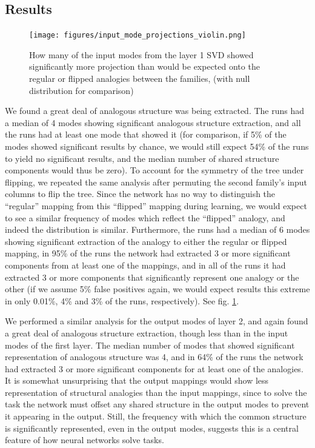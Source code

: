 \documentclass[10pt,letterpaper]{article}
\begin{document}
\subsection{Results}
\begin{figure}
\centering
\texttt{[image: figures/input\_mode\_projections\_violin.png]}
\caption{How many of the input modes from the layer 1 SVD showed significantly more projection than would be expected onto the regular or flipped analogies between the families, (with null distribution for comparison)}
\label{ft_input_mode_sig_hist}
\end{figure}
We found a great deal of analogous structure was being extracted. The runs had a median of 4 modes showing significant analogous structure extraction, and all the runs had at least one mode that showed it (for comparison, if 5\% of the modes showed significant results by chance, we would still expect 54\% of the runs to yield no significant results, and the median number of shared structure components would thus be zero). To account for the symmetry of the tree under flipping, we repeated the same analysis after permuting the second family's input columns to flip the tree. Since the network has no way to distinguish the ``regular'' mapping from this ``flipped'' mapping during learning, we would expect to see a similar frequency of modes which reflect the ``flipped'' analogy, and indeed the distribution is similar. Furthermore, the runs had a median of 6 modes showing significant extraction of the analogy to either the regular or flipped mapping, in 95\% of the runs the network had extracted 3 or more significant components from at least one of the mappings, and in all of the runs it had extracted 3 or more components that significantly represent one analogy or the other (if we assume 5\% false positives again, we would expect results this extreme in only 0.01\%, 4\% and 3\% of the runs, respectively). See fig. \ref{ft_input_mode_sig_hist}. \par
We performed a similar analysis for the output modes of layer 2, and again found a great deal of analogous structure extraction, though less than in the input modes of the first layer. The median number of modes that showed significant representation of analogous structure was 4, and in 64\% of the runs the network had extracted 3 or more significant components for at least one of the analogies. It is somewhat unsurprising that the output mappings would show less representation of structural analogies than the input mappings, since to solve the task the network must offset any shared structure in the output modes to prevent it appearing in the output. Still, the frequency with which the common structure is significantly represented, even in the output modes, suggests this is a central feature of how neural networks solve tasks. \par  
\end{document}
